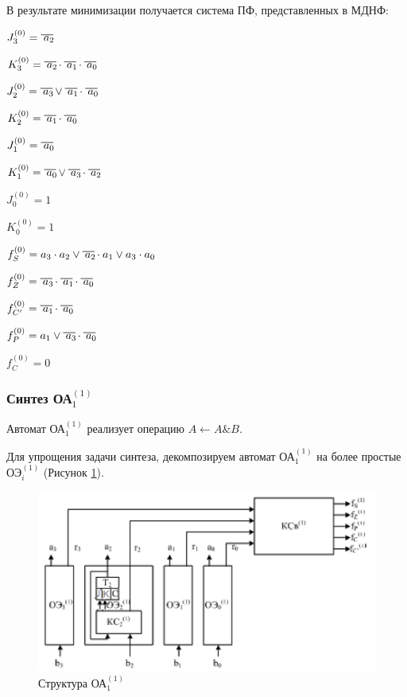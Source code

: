 

В результате минимизации получается система ПФ, представленных в МДНФ:

$J^{(0)}_{3} = \oline{a_2}$

$K^{(0)}_{3} = \oline{a_2} \cdot \oline{a_1} \cdot \oline{a_0}$

$J^{(0)}_{2} = \oline{a_3} \vee \oline{a_1} \cdot \oline{a_0}$

$K^{(0)}_{2} = \oline{a_1} \cdot \oline{a_0}$

$J^{(0)}_{1} = \oline{a_0}$

$K^{(0)}_{1} = \oline{a_0} \vee \oline{a_3} \cdot \oline{a_2}$

$J^{(0)}_{0} = 1$

$K^{(0)}_{0} = 1$

$f^{(0)}_{S} = a_3 \cdot a_2 \vee \oline{a_2} \cdot a_1 \vee a_3 \cdot a_0 $

$f^{(0)}_{Z} = \oline{a_3} \cdot \oline{a_1} \cdot \oline{a_0}$

$f^{(0)}_{C'} = \oline{a_1} \cdot \oline{a_0}$

$f^{(0)}_{P} = a_1 \vee \oline{a_3} \cdot \oline{a_0}$

$f^{(0)}_{C} = 0$


\subsubsection{Синтез ОА$^{(1)}_{1}$}

Автомат ОА$^{(1)}_{1}$ реализует операцию $A \leftarrow A \& B$.

Для упрощения задачи синтеза, декомпозируем автомат ОА$^{(1)}_{1}$ на более простые ОЭ$^{(1)}_i$ (Рисунок \ref{figure:oa11_str}). 

\begin{figure}[H]
	\includegraphics[scale=0.6]{images/oe.png}
	\caption{Структура ОА$^{(1)}_{1}$}
	\label{figure:oa11_str}
\end{figure}

